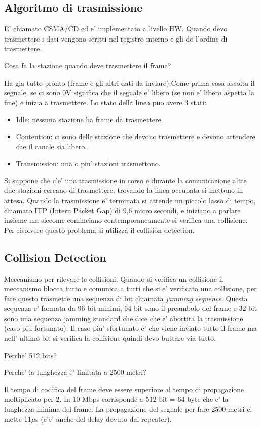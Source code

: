 \subsection{Algoritmo di trasmissione}
E' chiamato CSMA/CD ed e' implementato a livello HW. Quando devo trasmettere i dati vengono scritti nel registro interno e gli do l'ordine di trasmettere.
\begin{Question}
  Cosa fa la stazione quando deve trasmettere il frame?
\end{Question}
Ha gia tutto pronto (frame e gli altri dati da inviare).Come prima cosa ascolta il segnale, se ci sono 0V significa che il segnale e' libero (se non e' libero aspetta la fine) e inizia a trasmettere. Lo stato della linea puo avere 3 stati:
\begin{itemize}
  \item Idle: nessuna stazione ha frame da trasmettere.
  \item Contention: ci sono delle stazione che devono trasmettere e devono attendere che il canale sia libero.
  \item Transmission: una o piu' stazioni trasmettono.
\end{itemize}
Si suppone che c'e' una trasmissione in corso e durante la comunicazione altre due stazioni cercano di trasmettere, trovando la linea occupata si mettono in attesa. Quando la trasmissione e' terminata si attende un piccolo lasso di tempo, chiamato ITP (Intern Packet Gap) di 9,6 micro secondi, e iniziano a parlare insieme ma siccome cominciano contemporaneamente si verifica una collisione. Per risolvere questo problema si utilizza il collision detection.
\subsection{Collision Detection}
Meccanismo per rilevare le collisioni. Quando si verifica un collisione il meccanismo blocca tutto e comunica a tutti che si e' verificata una collisione, per fare questo trasmette una sequenza di bit chiamata \textit{jamming sequence}. Questa sequenza e' formata da 96 bit minimi, 64 bit sono il preambolo del frame e 32 bit sono una sequenza jamming standard che dice che e' abortita la trasmissione (caso piu fortunato). Il caso piu' sfortunato e' che viene inviato tutto il frame ma nell' ultimo bit si verifica la collisione quindi devo buttare via tutto.
\begin{Question}
  Perche' 512 bits?
\end{Question}
\begin{Question}
  Perche' la lunghezza e' limitata a 2500 metri?
\end{Question}
Il tempo di codifica del frame deve essere superiore al tempo di propagazione moltiplicato per 2. In 10 Mbps corrisponde a 512 bit = 64 byte che e' la lunghezza minima del frame. La propagazione del segnale per fare 2500 metri ci mette 11$\mu$s (c'e' anche del delay dovuto dai repeater).
